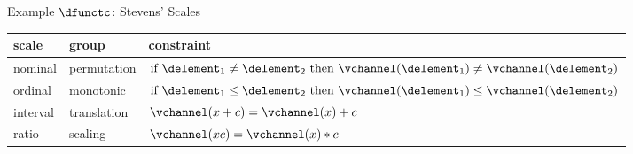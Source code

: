 \documentclass[xcolor={dvipsnames}, handout]{beamer}
\begin{document}
\begin{frame}{Example $\dfunctc$: Stevens' Scales \cite{stevensTheoryScalesMeasurement1946}}
\begin{table}[H]
    \begin{tabularx}{\textwidth}{|l|l|X|}\toprule
        \textbf{scale} & \textbf{group} & \textbf{constraint} \\\midrule
        nominal & permutation &  $\text{if } \delement_1 \neq \delement_2 \text{ then } \vchannel (\delement_1) \neq\vchannel(\delement_2)$\\
        ordinal &  monotonic & $\text{if } \delement_1 \leq \delement_2 \text{ then } \vchannel (\delement_1) \leq \vchannel(\delement_2)$\\
        interval &  translation &  $\vchannel (x + c) = \vchannel(x) + c$ \\
        ratio &  scaling &  $\vchannel(xc) = \vchannel(x)*c $\\ \bottomrule
    \end{tabularx}
\end{table}
\end{frame}
\end{document}

